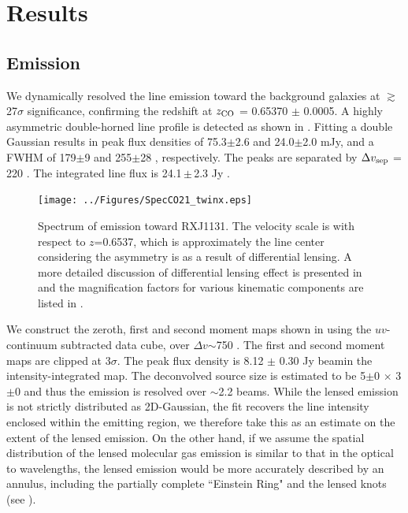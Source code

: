 \documentclass[]{emulateapj}
\begin{document}
\section{Results}
\subsection{\bco Emission} %
We dynamically resolved the \bco line emission toward the background galaxies
at $\gtrsim$27$\sigma$ significance, confirming the redshift at $z_{\rm CO}$ =
0.65370 $\pm$ 0.0005. A highly asymmetric double-horned line profile is
detected as shown in . Fitting a double Gaussian results in peak
flux densities of 75.3$\pm$2.6 and 24.0$\pm$2.0 mJy, and a FWHM of
179$\pm$9 \kms and 255$\pm$28 \kms, respectively. The peaks are separated by
$\Delta v_{\rm sep}$ = 220 \kms. The integrated line flux is 24.1\,$\pm$\,2.3 Jy \kms. %

\begin{figure}[tbph]
\centering
\texttt{[image: ../Figures/SpecCO21\_twinx.eps]}
\caption{ Spectrum of \bco emission toward RXJ1131. The velocity scale
is with respect to $z$=0.6537, which is approximately the line center
considering the asymmetry is as a result of differential lensing.
A more detailed discussion of differential lensing effect is presented in
 and the magnification factors for various kinematic
components are listed in .
 \label{fig:CO21spec}}
\end{figure}

We construct the zeroth, first and second moment maps shown in 
using the $uv$-continuum subtracted data cube, over $\Delta v$$\sim$750 \kms.
The first and second moment maps are clipped at 3$\sigma$.
The peak flux density is 8.12 $\pm$ 0.30 Jy\,\kms\,beam\pmOne in the intensity-integrated
map. The deconvolved source size is estimated to be 5$\pm$0 $\times$ 3$\pm$0 
and thus the emission is resolved over $\sim$2.2 beams. 
While the lensed emission is not strictly distributed as 2D-Gaussian, 
the fit recovers the line intensity enclosed within the emitting
region, we therefore take this as an estimate on the extent of the lensed
emission. On the other hand, if we assume the spatial distribution of
the lensed molecular gas emission is similar to that in the optical to \nir
wavelengths, the lensed emission would be more accurately described by an
annulus, including the partially complete ``Einstein Ring" and
the lensed knots (see ).
\end{document}
